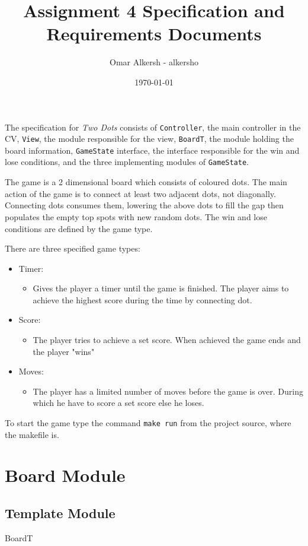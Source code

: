 \documentclass[11pt]{article}
\author{Omar Alkersh - alkersho}
\date{\today}
\title{Assignment 4 Specification and Requirements Documents}
\begin{document}
\maketitle
The specification for \emph{Two Dots} consists of \texttt{Controller}, the main controller in the CV, \texttt{View}, the module responsible for the view, \texttt{BoardT}, the module holding the board information, \texttt{GameState} interface, the interface responsible for the win and lose conditions, and the three implementing modules of \texttt{GameState}.

The game is a 2 dimensional board which consists of coloured dots. The main action of the game is to connect at least two adjacent dots, not diagonally. Connecting dots consumes them, lowering the above dots to fill the gap then populates the empty top spots with new random dots. The win and lose conditions are defined by the game type.

There are three specified game types:

\begin{itemize}
\item Timer:
\begin{itemize}
\item Gives the player a timer until the game is finished. The player aims to achieve the highest score during the time by connecting dot.
\end{itemize}
\item Score:
\begin{itemize}
\item The player tries to achieve a set score. When achieved the game ends and the player "wins"
\end{itemize}
\item Moves:
\begin{itemize}
\item The player has a limited number of moves before the game is over. During which he have to score a set score else he loses.
\end{itemize}
\end{itemize}

To start the game type the command \texttt{make run} from the project source, where the makefile is.

\newpage
\section{Board Module}
\label{sec:org5c9018a}
\subsection*{Template Module}
\label{sec:org1d3c8ca}
BoardT
\end{document}
